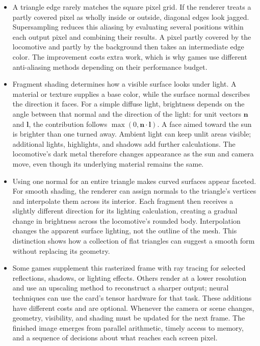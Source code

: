 \documentclass[10pt]{article}
\begin{document}
\begin{itemize}[leftmargin=1.25em, itemsep=0.3em, parsep=0pt, topsep=0pt]
    \item A triangle edge rarely matches the square pixel grid. If the renderer treats a partly covered pixel as wholly inside or outside, diagonal edges look jagged. Supersampling reduces this aliasing by evaluating several positions within each output pixel and combining their results. A pixel partly covered by the locomotive and partly by the background then takes an intermediate edge color. The improvement costs extra work, which is why games use different anti-aliasing methods depending on their performance budget.

    \item Fragment shading determines how a visible surface looks under light. A material or texture supplies a base color, while the surface normal describes the direction it faces. For a simple diffuse light, brightness depends on the angle between that normal and the direction of the light: for unit vectors \(\mathbf n\) and \(\mathbf l\), the contribution follows \(\max(0,\mathbf n\!\cdot\!\mathbf l)\). A face aimed toward the sun is brighter than one turned away. Ambient light can keep unlit areas visible; additional lights, highlights, and shadows add further calculations. The locomotive's dark metal therefore changes appearance as the sun and camera move, even though its underlying material remains the same.

    \item Using one normal for an entire triangle makes curved surfaces appear faceted. For smooth shading, the renderer can assign normals to the triangle's vertices and interpolate them across its interior. Each fragment then receives a slightly different direction for its lighting calculation, creating a gradual change in brightness across the locomotive's rounded body. Interpolation changes the apparent surface lighting, not the outline of the mesh. This distinction shows how a collection of flat triangles can suggest a smooth form without replacing its geometry.

    \item Some games supplement this rasterized frame with ray tracing for selected reflections, shadows, or lighting effects. Others render at a lower resolution and use an upscaling method to reconstruct a sharper output; neural techniques can use the card's tensor hardware for that task. These additions have different costs and are optional. Whenever the camera or scene changes, geometry, visibility, and shading must be updated for the next frame. The finished image emerges from parallel arithmetic, timely access to memory, and a sequence of decisions about what reaches each screen pixel.
\end{itemize}

\end{document}
